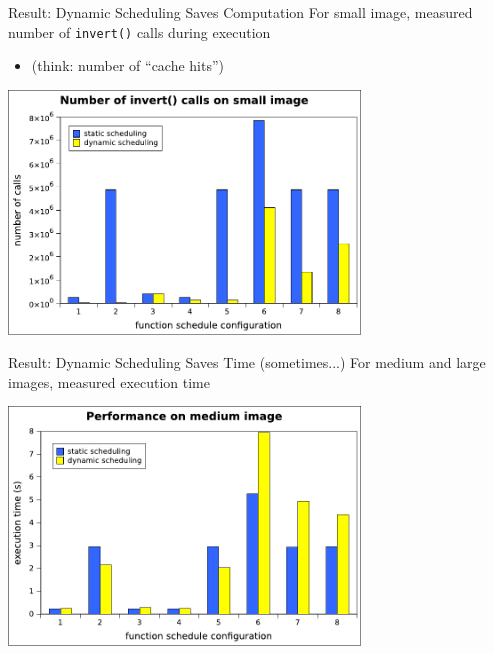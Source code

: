 \documentclass[xcolor=dvipsnames]{beamer}
\begin{document}
\begin{frame}{Result: Dynamic Scheduling Saves Computation}
	For small image, measured number of \texttt{invert()} calls during execution
	\begin{itemize}
		\item (think: number of ``cache hits'')
	\end{itemize}
	\linegap

	\begin{center}
	\includegraphics[width=0.7\textwidth]{graphs/small.pdf}
	\end{center}
\end{frame}

\begin{frame}{Result: Dynamic Scheduling Saves Time (sometimes...)}
	For medium and large images, measured execution time

	\begin{center}
	\includegraphics[width=0.7\textwidth]{graphs/medium.pdf}
	\end{center}
\end{frame}
\end{document}
